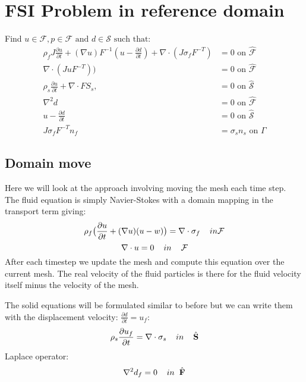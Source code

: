 \section{FSI Problem in reference domain}
Find $u \in \mathcal{F} , p \in \mathcal{F} \text{  and  } d \in \mathcal{S} \text{  such that}:$ 
\begin{align}
\rho_f J \frac{\partial u}{\partial t} + (\nabla u)F^{-1}(u-\frac{\partial d}{\partial t})  + \nabla \cdot( J\sigma_f F^{-T})  &= 0 \text{  on  } \mathcal{\hat{F} } \\
\nabla \cdot (J u F^{-T})\big) &= 0 \text{  on  } \mathcal{\hat{F}}   \\
\rho_s \frac{\partial u}{\partial t} + \nabla \cdot F S_s,&=0  \text{  on  } \mathcal{\hat{S}}\\
\nabla^2 d &= 0  \text{  on  } \mathcal{\hat{F}}\\
u- \frac{\partial d}{\partial t}  &= 0  \text{  on  } \mathcal{\hat{S}}\\
J\sigma_f F^{-T} n_f &= \sigma_s  n_s \text{  on  } \Gamma
\end{align}

\subsection*{Domain move}
Here we will look at the approach involving moving the mesh each time step. \\
The fluid equation is simply Navier-Stokes with a domain mapping in the transport term giving:
$$ \rho_f \big( \frac{\partial u}{\partial t} + (\nabla u)(u-w)\big) = \nabla \cdot \sigma_f \hspace{4mm} in \mathcal{F}$$
$$ \nabla \cdot u = 0  \hspace{4mm} in \hspace{4mm} \mathcal{F} $$
After each timestep we update the mesh and compute this equation over the current mesh. The real velocity of the fluid particles is there for the fluid velocity itself minus the velocity of the mesh. 

The solid equations will be formulated similar to before but we can write them with the displacement velocity: $ \frac{\partial d}{\partial t} = u_f $:
$$ \rho_s \frac{\partial u_f}{\partial t} = \nabla \cdot \sigma_s \hspace{4mm}in\hspace{4mm} \mathcal{\hat{S}} $$
Laplace operator:
$$ \nabla^2 d_f = 0\hspace{4mm}in \hspace{2mm} \mathcal{\hat{F}}$$

